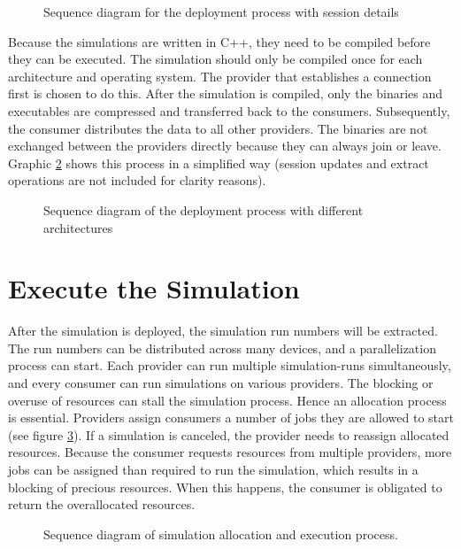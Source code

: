 \begin{figure}[h]
  \centering
  
  \caption{Sequence diagram for the deployment process with session details}
  \label{fig:Sequence-Deploy-Detail}
\end{figure}

Because the simulations are written in C++, they need to be compiled before they can be executed. The simulation should only be compiled once for each architecture and operating system. The provider that establishes a connection first is chosen to do this. After the simulation is compiled, only the binaries and executables are compressed and transferred back to the consumers. Subsequently, the consumer distributes the data to all other providers. The binaries are not exchanged between the providers directly because they can always join or leave. Graphic \ref{fig:Sequence-Deploy-Arch} shows this process in a simplified way (session updates and extract operations are not included for clarity reasons).

\begin{figure}[h]
  \centering
  
  \caption{Sequence diagram of the deployment process with different architectures}
  \label{fig:Sequence-Deploy-Arch}
\end{figure}

\section{Execute the Simulation}

After the simulation is deployed, the simulation run numbers will be extracted. The run numbers can be distributed across many devices, and a parallelization process can start. Each provider can run multiple simulation-runs simultaneously, and every consumer can run simulations on various providers. The blocking or overuse of resources can stall the simulation process. Hence an allocation process is essential. Providers assign consumers a number of jobs they are allowed to start (see figure \ref{fig:Sequence-Execute}). If a simulation is canceled, the provider needs to reassign allocated resources. Because the consumer requests resources from multiple providers, more jobs can be assigned than required to run the simulation, which results in a blocking of precious resources. When this happens, the consumer is obligated to return the overallocated resources.

\begin{figure}[h]
  \centering
  
  \caption{Sequence diagram of simulation allocation and execution process.}
  \label{fig:Sequence-Execute}
\end{figure}

